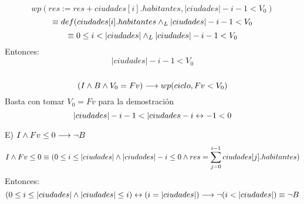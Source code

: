 \documentclass[10pt,a4paper]{article}
\begin{document}
\[wp(res:= res+ciudades[i].habitantes, |ciudades|-i-1<V_0) \]
\[\equiv def(ciudades[i].habitantes \land _L |ciudades|-i-1<V_0 \]
\[\equiv 0\leq i<|ciudades| \yLuego |ciudades|-i-1<V_0 \]
\hspace{1cm}Entonces:\\  \[ |ciudades|-i-1<V_0\]
\\
\[(I \land B\land V_0 = Fv) \longrightarrow wp(ciclo,Fv<V_0)\]
\hspace{1cm}Basta con tomar  $V_0 =Fv$  para  la  demostración  \\
\[|ciudades|-i-1<|ciudades-i \Iff -1<0\]


\hspace{0.5cm}E) $I \land Fv \leq 0 \longrightarrow \neg B$\\
\[I \land Fv \leq 0 \equiv (0 \leq i \leq |ciudades| \land |ciudades|-i \leq 0 \land {res = \sum\limits_{j=0}^{i-1}ciudades[j].habitantes}) \\ \]
\hspace{1cm}Entonces:
\[ (0\leq i \leq |ciudades| \land |ciudades|\leq i) \Iff (i=|ciudades|) \implica \neg(i<|ciudades|) \equiv \neg B\] \\
\end{document}
